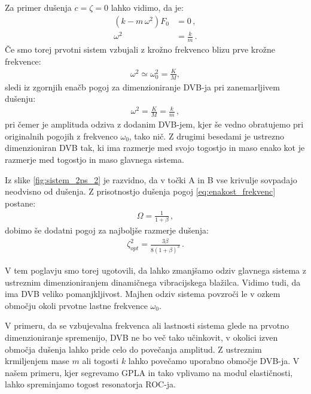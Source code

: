         Za primer dušenja $c=\zeta=0$ lahko vidimo, da je:
        \begin{align}
            (k-m \, \omega^2) F_0 &= 0 \nonumber \,,\\
            \omega^2&=\frac{k}{m}\,.
        \end{align}
        Če smo torej prvotni sistem vzbujali z krožno frekvenco blizu prve krožne frekvence: 
        \begin{align}
            \omega^2 \simeq \omega_0^2=\frac{K}{M} ,
        \end{align}
        sledi iz zgornjih enačb pogoj za dimenzioniranje DVB-ja pri zanemarljivem dušenju:
        \begin{align}\label{eq:enakost_frekvenc}
            \omega^2 =\frac{K}{M} =\frac{k}{m} \,,
        \end{align}
        pri čemer je amplituda odziva z dodanim DVB-jem, kjer še vedno obratujemo pri originalnih pogojih z frekvenco $\omega_0$, tako nič. Z drugimi besedami je ustrezno dimenzioniran DVB tak, ki ima razmerje med svojo togostjo in maso enako kot je razmerje med togostjo in maso glavnega sistema. 
        
        Iz slike \ref{fig:sistem_2ps_2} je razvidno, da v točki A in B vse krivulje sovpadajo neodvisno od dušenja. Z prisotnostjo dušenja pogoj \eqref{eq:enakost_frekvenc} postane:
        \begin{align}
            \Omega=\frac{1}{1+\beta}\,,
        \end{align}
        dobimo še dodatni pogoj za najboljše razmerje dušenja:
        \begin{align}
            \zeta_{opt}^2=\frac{3\beta}{8(1+\beta)^3}\,.
        \end{align}

        V tem poglavju smo torej ugotovili, da lahko zmanjšamo odziv glavnega sistema z ustreznim dimenzioniranjem dinamičnega vibracijskega blažilca. Vidimo tudi, da ima DVB veliko pomanjkljivost. Majhen odziv sistema povzroči le v ozkem območju okoli prvotne lastne frekvence $\omega_0$. 
        
        V primeru, da se vzbujevalna frekvenca ali lastnosti sistema glede na prvotno dimenzioniranje spremenijo, DVB ne bo več tako učinkovit, v okolici izven območja dušenja lahko pride celo do povečanja amplitud. Z ustreznim krmiljenjem mase $m$ ali togosti $k$ lahko povečamo uporabno območje DVB-ja. V našem primeru, kjer segrevamo GPLA in tako vplivamo na modul elastičnosti, lahko spreminjamo togost resonatorja ROC-ja. 
        
